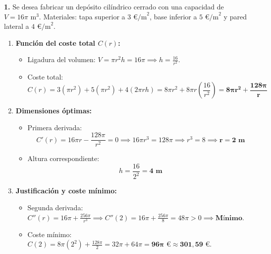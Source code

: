 \documentclass[11pt,a4paper]{article}
\begin{document}
\pagestyle{empty}

\noindent\textbf{1.} Se desea fabricar un depósito cilíndrico cerrado con una capacidad de $V = 16\pi\text{ m}^3$. Materiales: tapa superior a $3\text{ €/m}^2$, base inferior a $5\text{ €/m}^2$ y pared lateral a $4\text{ €/m}^2$.
\begin{enumerate}[label=\textbf{\alph*)}, leftmargin=2em, itemsep=6pt]
    \item \textbf{Función del coste total $C(r)$:}
    \begin{itemize}[leftmargin=1.5em, itemsep=2pt]
        \item Ligadura del volumen: $V = \pi r^2 h = 16\pi \implies h = \frac{16}{r^2}$.
        \item Coste total:
        \[
        C(r) = 3(\pi r^2) + 5(\pi r^2) + 4(2\pi r h) = 8\pi r^2 + 8\pi r \left(\frac{16}{r^2}\right) = \mathbf{8\pi r^2 + \frac{128\pi}{r}}
        \]
    \end{itemize}

    \item \textbf{Dimensiones óptimas:}
    \begin{itemize}[leftmargin=1.5em, itemsep=2pt]
        \item Primera derivada:
        \[
        C'(r) = 16\pi r - \frac{128\pi}{r^2} = 0 \implies 16\pi r^3 = 128\pi \implies r^3 = 8 \implies \mathbf{r = 2\text{ m}}
        \]
        \item Altura correspondiente:
        \[
        h = \frac{16}{2^2} = \mathbf{4\text{ m}}
        \]
    \end{itemize}

    \item \textbf{Justificación y coste mínimo:}
    \begin{itemize}[leftmargin=1.5em, itemsep=2pt]
        \item Segunda derivada: $C''(r) = 16\pi + \frac{256\pi}{r^3} \implies C''(2) = 16\pi + \frac{256\pi}{8} = 48\pi > 0 \implies \textbf{Mínimo}$.
        \item Coste mínimo: $C(2) = 8\pi(2^2) + \frac{128\pi}{2} = 32\pi + 64\pi = \mathbf{96\pi\text{ €} \approx 301{,}59\text{ €}}$.
    \end{itemize}
\end{enumerate}

\vspace{0.8cm}
\end{document}
